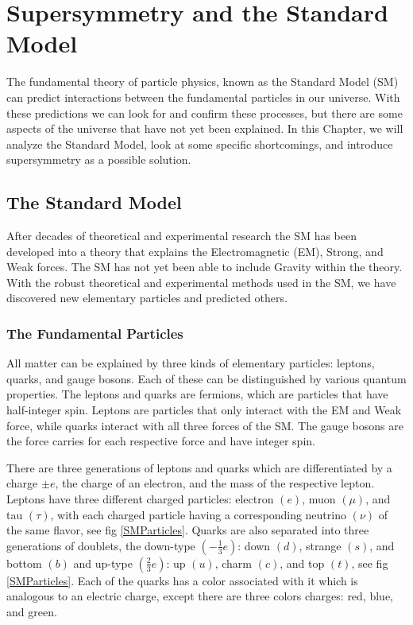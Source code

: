 \chapter{Supersymmetry and the Standard Model}
\label{ch:SUSY}

The fundamental theory of particle physics, known as the Standard Model (SM) can predict interactions between the fundamental particles in our universe. With these predictions we can look for and confirm these processes, but there are some aspects of the universe that have not yet been explained. In this Chapter, we will analyze the Standard Model, look at some specific shortcomings, and introduce supersymmetry as a possible solution.

\section{The Standard Model}
\label{sec:SM}

After decades of theoretical and experimental research the SM has been developed into a theory that explains the Electromagnetic (EM), Strong, and Weak forces. The SM has not yet been able to include Gravity within the theory. With the robust theoretical and experimental methods used in the SM, we have discovered new elementary particles and predicted others. 

\subsection{The Fundamental Particles}

 All matter can be explained by three kinds of elementary particles: leptons, quarks, and gauge bosons. Each of these can be distinguished by various quantum properties. The leptons and quarks are fermions, which are particles that have half-integer spin. Leptons are particles that only interact with the EM and Weak force, while quarks interact with all three forces of the SM. The gauge bosons are the force carries for each respective force and have integer spin. 
 
 There are three generations of leptons and quarks which are differentiated by a charge $\pm e$, the charge of an electron, and the mass of the respective lepton. Leptons have three different charged particles: electron $(e)$, muon $(\mu)$, and tau $(\tau)$, with each charged particle having a corresponding neutrino $(\nu)$ of the same flavor, see fig \ref{SMParticles}. Quarks are also separated into three generations of doublets, the down-type $(-\frac{1}{3}e)$: down $(d)$, strange $(s)$, and bottom $(b)$ and up-type $(\frac{2}{3}e)$: up $(u)$, charm $(c)$, and top $(t)$, see fig \ref{SMParticles}. Each of the quarks has a color associated with it which is analogous to an electric charge, except there are three colors charges: red, blue, and green.  

